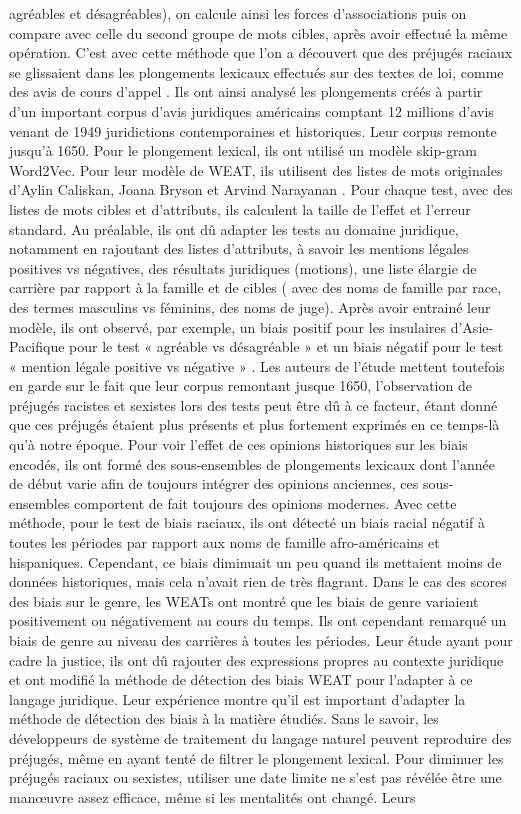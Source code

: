 \documentclass{article}
\begin{document}
agréables et désagréables), on calcule ainsi les forces d’associations puis on compare avec celle du second groupe de mots cibles, après avoir effectué la même opération. C’est avec cette méthode que l’on a découvert que des préjugés raciaux se glissaient dans les plongements lexicaux effectués sur des textes de loi, comme des avis de cours d’appel \cite{matthews2022gender}. Ils ont ainsi analysé les plongements créés à partir d’un important corpus d’avis juridiques américains comptant 12 millions d’avis venant de 1949 juridictions contemporaines et historiques. Leur corpus remonte jusqu’à 1650. Pour le plongement lexical, ils ont utilisé un  modèle skip-gram Word2Vec. Pour leur modèle de WEAT, ils utilisent des listes de mots originales d’Aylin Caliskan, Joana Bryson et Arvind Narayanan \cite{caliskan2017semantics}. Pour chaque test, avec des listes de mots cibles et d’attributs, ils calculent la taille de l’effet et l’erreur standard. Au préalable, ils ont dû adapter les tests au domaine juridique, notamment en rajoutant des listes d’attributs, à savoir les mentions légales positives vs négatives, des résultats juridiques (motions), une liste élargie de carrière par rapport à la famille et de cibles ( avec des noms de famille par race, des termes masculins vs féminins, des noms de juge). Après avoir entrainé leur modèle, ils ont observé, par exemple, un biais positif pour les insulaires d’Asie-Pacifique pour le test « agréable vs désagréable » et un biais négatif pour le test « mention légale positive vs négative » \cite{matthews2022gender}. Les auteurs de l’étude mettent toutefois en garde sur le fait que leur corpus remontant jusque 1650, l’observation de préjugés racistes et sexistes lors des tests peut être dû à ce facteur, étant donné que ces préjugés étaient plus présents et plus fortement exprimés en ce temps-là qu’à notre époque. Pour voir l’effet de ces opinions historiques sur les biais encodés, ils ont formé des sous-ensembles de plongements lexicaux dont l’année de début varie afin de toujours intégrer des opinions anciennes, ces sous-ensembles comportent de fait toujours des opinions modernes. Avec cette méthode, pour le test de biais raciaux, ils ont détecté un biais racial négatif à toutes les périodes par rapport aux noms de famille afro-américains et hispaniques. Cependant, ce biais diminuait un peu quand ils mettaient moins de données historiques, mais cela n’avait rien de très flagrant. Dans le cas des scores des biais sur le genre, les WEATs ont montré que les biais de genre variaient positivement ou négativement au cours du temps. Ils ont cependant remarqué un biais de genre au niveau des carrières à toutes les périodes. Leur étude ayant pour cadre la justice, ils ont dû rajouter des expressions propres au contexte juridique et ont modifié la méthode de détection des biais WEAT pour l’adapter à ce langage juridique. Leur expérience montre qu’il est important d’adapter la méthode de détection des biais à la matière étudiés. Sans le savoir, les développeurs de système de traitement du langage naturel peuvent reproduire des préjugés, même en ayant tenté de filtrer le plongement lexical. Pour diminuer les préjugés raciaux ou sexistes, utiliser une date limite ne s’est pas révélée être une manœuvre assez efficace, même si les mentalités ont changé. Leurs 
\end{document}
